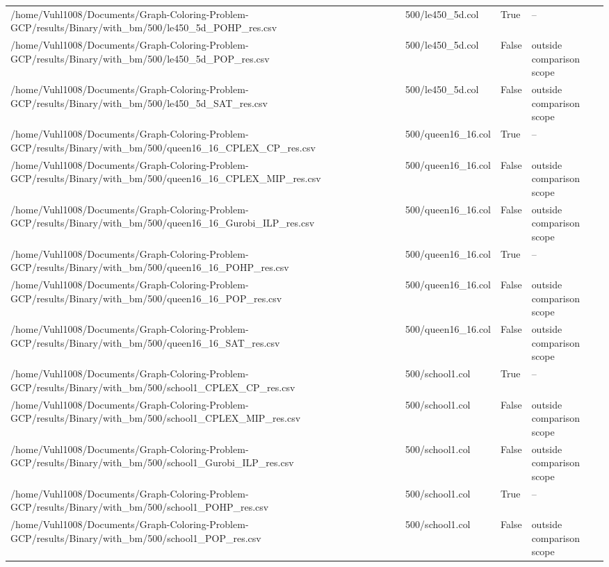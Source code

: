 \begin{table}[htbp]
\begin{tabular}{llll}
/home/Vuhl1008/Documents/Graph-Coloring-Problem-GCP/results/Binary/with\_bm/500/le450\_5d\_POHP\_res.csv & 500/le450\_5d.col & True & -- \\
/home/Vuhl1008/Documents/Graph-Coloring-Problem-GCP/results/Binary/with\_bm/500/le450\_5d\_POP\_res.csv & 500/le450\_5d.col & False & outside comparison scope \\
/home/Vuhl1008/Documents/Graph-Coloring-Problem-GCP/results/Binary/with\_bm/500/le450\_5d\_SAT\_res.csv & 500/le450\_5d.col & False & outside comparison scope \\
/home/Vuhl1008/Documents/Graph-Coloring-Problem-GCP/results/Binary/with\_bm/500/queen16\_16\_CPLEX\_CP\_res.csv & 500/queen16\_16.col & True & -- \\
/home/Vuhl1008/Documents/Graph-Coloring-Problem-GCP/results/Binary/with\_bm/500/queen16\_16\_CPLEX\_MIP\_res.csv & 500/queen16\_16.col & False & outside comparison scope \\
/home/Vuhl1008/Documents/Graph-Coloring-Problem-GCP/results/Binary/with\_bm/500/queen16\_16\_Gurobi\_ILP\_res.csv & 500/queen16\_16.col & False & outside comparison scope \\
/home/Vuhl1008/Documents/Graph-Coloring-Problem-GCP/results/Binary/with\_bm/500/queen16\_16\_POHP\_res.csv & 500/queen16\_16.col & True & -- \\
/home/Vuhl1008/Documents/Graph-Coloring-Problem-GCP/results/Binary/with\_bm/500/queen16\_16\_POP\_res.csv & 500/queen16\_16.col & False & outside comparison scope \\
/home/Vuhl1008/Documents/Graph-Coloring-Problem-GCP/results/Binary/with\_bm/500/queen16\_16\_SAT\_res.csv & 500/queen16\_16.col & False & outside comparison scope \\
/home/Vuhl1008/Documents/Graph-Coloring-Problem-GCP/results/Binary/with\_bm/500/school1\_CPLEX\_CP\_res.csv & 500/school1.col & True & -- \\
/home/Vuhl1008/Documents/Graph-Coloring-Problem-GCP/results/Binary/with\_bm/500/school1\_CPLEX\_MIP\_res.csv & 500/school1.col & False & outside comparison scope \\
/home/Vuhl1008/Documents/Graph-Coloring-Problem-GCP/results/Binary/with\_bm/500/school1\_Gurobi\_ILP\_res.csv & 500/school1.col & False & outside comparison scope \\
/home/Vuhl1008/Documents/Graph-Coloring-Problem-GCP/results/Binary/with\_bm/500/school1\_POHP\_res.csv & 500/school1.col & True & -- \\
/home/Vuhl1008/Documents/Graph-Coloring-Problem-GCP/results/Binary/with\_bm/500/school1\_POP\_res.csv & 500/school1.col & False & outside comparison scope \\

\end{tabular}
\end{table}
